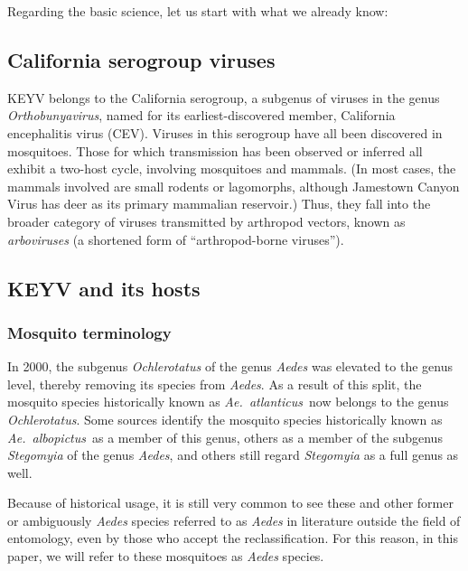 \documentclass[12pt]{article}
\newcommand{\alb}{\textit{Ae.\ albopictus}}
\newcommand{\atl}{\textit{Ae.\ atlanticus}}
\begin{document}
        Regarding the basic science, let us start with what we already know:

        \subsection{California serogroup viruses}
            \label{california-serogroup}
            KEYV belongs to the California serogroup, a subgenus of viruses in the genus \textit{Orthobunyavirus}, named for its earliest-discovered member, California encephalitis virus (CEV). Viruses in this serogroup have all been discovered in mosquitoes. Those for which transmission has been observed or inferred all exhibit a two-host cycle, involving mosquitoes and mammals. (In most cases, the mammals involved are small rodents or lagomorphs, although Jamestown Canyon Virus has deer as its primary mammalian reservoir.) Thus, they fall into the broader category of viruses transmitted by arthropod vectors, known as \textit{arboviruses} (a shortened form of ``arthropod-borne viruses'').
        
        \subsection{KEYV and its hosts}
            \label{california-keystone}
            \subsubsection{Mosquito terminology}
                \label{mosquito-terminology}
                In 2000, the subgenus \textit{Ochlerotatus} of the genus \textit{Aedes} was elevated to the genus level, thereby removing its species from \textit{Aedes}. As a result of this split, the mosquito species historically known as \atl\ now belongs to the genus \textit{Ochlerotatus}\cite{reinert2000new}. Some sources identify the mosquito species historically known as \alb\ as a member of this genus, others as a member of the subgenus \textit{Stegomyia} of the genus \textit{Aedes}, and others still regard \textit{Stegomyia} as a full genus as well.
                
                Because of historical usage, it is still very common to see these and other former or ambiguously \textit{Aedes} species referred to as \textit{Aedes} in literature outside the field of entomology, even by those who accept the reclassification. For this reason, in this paper, we will refer to these mosquitoes as \textit{Aedes} species.
\end{document}
